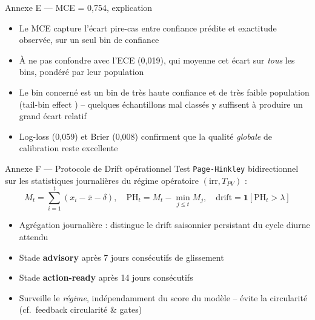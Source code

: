 \documentclass[10pt,aspectratio=169]{beamer}
\begin{document}
\begin{frame}{Annexe E --- MCE = 0,754, explication}
  \footnotesize
  \begin{itemize}
    \item Le MCE capture l'écart \alert{pire-cas} entre confiance prédite et exactitude observée, sur un seul bin de confiance
    \item À ne pas confondre avec l'ECE (0,019), qui moyenne cet écart sur \emph{tous} les bins, pondéré par leur population
    \item Le bin concerné est un bin de très haute confiance et de très faible population (\og tail-bin effect \fg) -- quelques échantillons mal classés y suffisent à produire un grand écart relatif
    \item Log-loss (0,059) et Brier (0,008) confirment que la qualité \emph{globale} de calibration reste excellente
  \end{itemize}
\end{frame}

\begin{frame}{Annexe F --- Protocole de Drift opérationnel}
  \footnotesize
  Test \texttt{Page-Hinkley} bidirectionnel sur les statistiques journalières du régime opératoire $(\mathrm{irr}, T_{PV})$ :
  \[
    M_t = \sum_{i=1}^{t}(x_i - \bar{x} - \delta), \quad \mathrm{PH}_t = M_t - \min_{j\le t} M_j, \quad \text{drift} = \mathbf{1}[\mathrm{PH}_t > \lambda]
  \]
  \begin{itemize}
    \item Agrégation \alert{journalière} : distingue le drift saisonnier persistant du cycle diurne attendu
    \item Stade \textbf{advisory} après 7 jours consécutifs de glissement
    \item Stade \textbf{action-ready} après 14 jours consécutifs
    \item Surveille le \emph{régime}, indépendamment du score du modèle -- évite la circularité (cf.\ feedback circularité \& gates)
  \end{itemize}
\end{frame}
\end{document}
